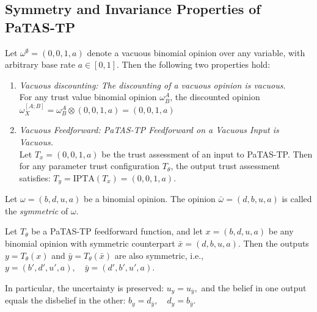 \subsection{Symmetry and Invariance Properties of \ac{PaTAS-TP}}\label{sec:ptassyminv}

\begin{theorem}\label{thm:infvac}
Let \( \omega^\emptyset = (0, 0, 1, a) \) denote a vacuous binomial opinion over any variable, with arbitrary base rate \( a \in [0, 1] \). Then the following two properties hold:

\begin{enumerate}
    \item \emph{Vacuous discounting: The discounting of a vacuous opinion is vacuous.} \\
    For any trust value binomial opinion \(\omega^A_B \), the discounted opinion
    \(
    \omega^{[A;B]}_X = \omega^A_B \otimes (0,0,1,a)= (0,0,1,a)
    \)
    \item \emph{Vacuous Feedforward: \ac{PaTAS-TP} Feedforward on a Vacuous Input is Vacuous.} \\
     Let \( T_x = (0,0,1,a)\) be the trust assessment of an input to \ac{PaTAS-TP}. Then for any parameter trust configuration \( T_\theta \), the output trust assessment satisfies:
    \(
    T_y = \text{IPTA}(T_x) = (0,0,1,a).
    \)
\end{enumerate}
\end{theorem}
\begin{definition}
Let \(\omega=(b, d, u, a)\) be a binomial opinion. The opinion $\bar{\omega} = (d, b, u, a)$ is called the \emph{symmetric} of $\omega$. 
\end{definition}
\begin{theorem}\label{thm:sym}
Let $T_\theta$ be a \ac{PaTAS-TP} feedforward function, and let $x = (b, d, u, a)$ be any binomial opinion with symmetric counterpart $\bar{x} = (d, b, u, a)$. Then the outputs $y = T_\theta(x)$ and $\bar{y} = T_\theta(\bar{x})$ are also symmetric, i.e.,
\(
y = (b', d', u', a), \quad \bar{y} = (d', b', u', a).
\)

In particular, the uncertainty is preserved:
\(
u_y = u_{\bar{y}},
\)
and the belief in one output equals the disbelief in the other:
\(
b_y = d_{\bar{y}}, \quad d_y = b_{\bar{y}}.
\)
\end{theorem}
